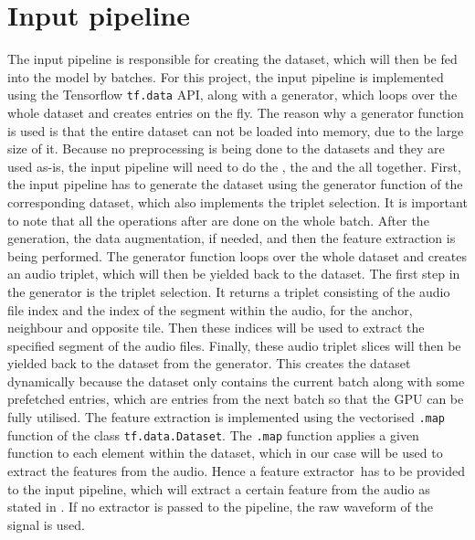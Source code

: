 \section{Input pipeline}
\label{sec:Input-Pipeline}
The input pipeline is responsible for creating the dataset, which will then be fed into the model by batches. For this project, the input pipeline is implemented using the Tensorflow \texttt{tf.data} API\footnotemark, along with a generator, which loops over the whole dataset and creates entries on the fly. The reason why a generator function is used is that the entire dataset can not be loaded into memory, due to the large size of it.
\newline
\newline
Because no preprocessing is being done to the datasets and they are used as-is, the input pipeline will need to do the , the  and the  all together.
\newline
\newline
First, the input pipeline has to generate the dataset using the generator function of the corresponding dataset, which also implements the triplet selection. It is important to note that all the operations after are done on the whole batch. After the generation, the data augmentation, if needed, and then the feature extraction is being performed.
\newline
\newline
The generator function loops over the whole dataset and creates an audio triplet, which will then be yielded back to the dataset. The first step in the generator is the triplet selection. It returns a triplet consisting of the audio file index and the index of the segment within the audio, for the anchor, neighbour and opposite tile. Then these indices will be used to extract the specified segment of the audio files. Finally, these audio triplet slices will then be yielded back to the dataset from the generator.
\newline
\newline
This creates the dataset dynamically because the dataset only contains the current batch along with some prefetched entries, which are entries from the next batch so that the \gls{GPU} can be fully utilised.
\newline
\newline
The feature extraction is implemented using the vectorised \texttt{.map} function of the class \texttt{tf.data.Dataset}\footnotemark. The \texttt{.map} function applies a given function to each element within the dataset, which in our case will be used to extract the features from the audio. Hence a \flqq feature extractor\frqq \ has to be provided to the input pipeline, which will extract a certain feature from the audio as stated in . If no extractor is passed to the pipeline, the raw waveform of the signal is used.
